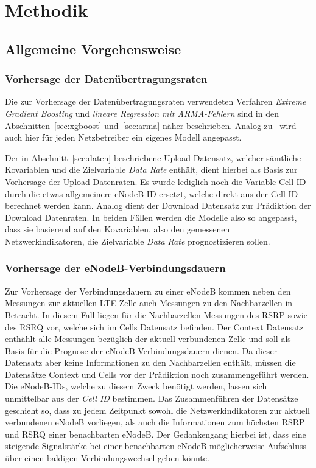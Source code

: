 \section{Methodik}

\subsection{Allgemeine Vorgehensweise}

\subsubsection{Vorhersage der Daten\"ubertragungsraten}

Die zur Vorhersage der Daten\"ubertragungsraten verwendeten Verfahren \textit{Extreme Gradient Boosting} und
\textit{lineare Regression mit ARMA-Fehlern} sind in den Abschnitten~\ref{sec:xgboost} und~\ref{sec:arma} n\"aher beschrieben.
Analog zu~\cite{IEEE} wird auch hier f\"ur jeden Netzbetreiber ein eigenes Modell angepasst.

Der in Abschnitt~\ref{sec:daten} beschriebene Upload Datensatz, welcher s\"amtliche Kovariablen und die Zielvariable
\textit{Data Rate} enth\"alt, dient hierbei als Basis zur Vorhersage der Upload-Datenraten.
Es wurde lediglich noch die Variable Cell ID durch die etwas allgemeinere eNodeB ID ersetzt, welche direkt aus der Cell ID
berechnet werden kann.
Analog dient der Download Datensatz zur Pr\"adiktion der Download Datenraten.
In beiden F\"allen werden die Modelle also so angepasst, dass sie basierend auf den Kovariablen, also den gemessenen Netzwerkindikatoren,
die Zielvariable \textit{Data Rate} prognostizieren sollen.

\subsubsection{Vorhersage der eNodeB-Verbindungsdauern}

Zur Vorhersage der Verbindungsdauern zu einer eNodeB kommen neben den Messungen zur aktuellen LTE-Zelle auch Messungen
zu den Nachbarzellen in Betracht. In diesem Fall liegen f\"ur die Nachbarzellen Messungen des RSRP sowie des RSRQ vor,
welche sich im Cells Datensatz befinden. Der Context Datensatz enth\"ahlt alle Messungen bez\"uglich der aktuell verbundenen
Zelle und soll als Basis f\"ur die Prognose der eNodeB-Verbindungsdauern dienen. Da dieser Datensatz aber keine Informationen
zu den Nachbarzellen enth\"alt, m\"ussen die Datens\"atze Context und Cells vor der Pr\"adiktion noch zusammengef\"uhrt werden.
Die eNodeB-IDs, welche zu diesem Zweck ben\"otigt werden, lassen sich unmittelbar aus der \textit{Cell ID} bestimmen.
Das Zusammenf\"uhren der Datens\"atze geschieht so,
dass zu jedem Zeitpunkt sowohl die Netzwerkindikatoren zur aktuell verbundenen eNodeB vorliegen, als auch die
Informationen zum h\"ochsten RSRP und RSRQ einer benachbarten eNodeB.
Der Gedankengang hierbei ist, dass eine steigende Signalst\"arke bei einer benachbarten eNodeB m\"oglicherweise Aufschluss \"uber einen
baldigen Verbindungswechsel geben k\"onnte.

